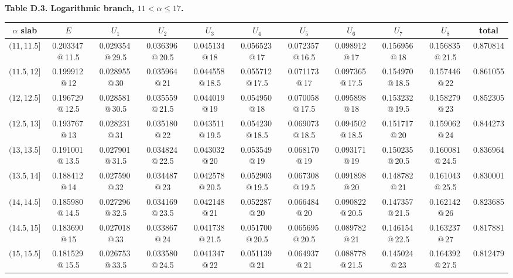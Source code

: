 \documentclass[11pt]{amsart}
\theoremstyle{definition}
\begin{document}
\begin{landscape}
\scriptsize
\setlength{\tabcolsep}{2.8pt}
\renewcommand{\arraystretch}{1.08}
\begin{center}
\textbf{Table D.3. Logarithmic branch, $11<\alpha\le17$.}\par\medskip
\begin{tabular}{c|c|cccccccc|c}
\toprule
$\alpha$ slab & $E$ & $U_1$ & $U_2$ & $U_3$ & $U_4$ & $U_5$ & $U_6$ & $U_7$ & $U_8$ & total\\
\midrule
$(11,11.5]$ & 0.203347\,@\,11.5 & 0.029354\,@\,29.5 & 0.036396\,@\,20.5 & 0.045134\,@\,18 & 0.056523\,@\,17 & 0.072357\,@\,16.5 & 0.098912\,@\,17 & 0.156956\,@\,18 & 0.156835\,@\,21.5 & 0.870814 \\
$(11.5,12]$ & 0.199912\,@\,12 & 0.028955\,@\,30 & 0.035964\,@\,21 & 0.044558\,@\,18.5 & 0.055712\,@\,17.5 & 0.071173\,@\,17 & 0.097365\,@\,17.5 & 0.154970\,@\,18.5 & 0.157446\,@\,22 & 0.861055 \\
$(12,12.5]$ & 0.196729\,@\,12.5 & 0.028581\,@\,30.5 & 0.035559\,@\,21.5 & 0.044019\,@\,19 & 0.054950\,@\,18 & 0.070058\,@\,17.5 & 0.095898\,@\,18 & 0.153232\,@\,19.5 & 0.158279\,@\,23 & 0.852305 \\
$(12.5,13]$ & 0.193767\,@\,13 & 0.028231\,@\,31 & 0.035180\,@\,22 & 0.043511\,@\,19.5 & 0.054230\,@\,18.5 & 0.069073\,@\,18.5 & 0.094502\,@\,18.5 & 0.151717\,@\,20 & 0.159062\,@\,24 & 0.844273 \\
$(13,13.5]$ & 0.191001\,@\,13.5 & 0.027901\,@\,31.5 & 0.034824\,@\,22.5 & 0.043032\,@\,20 & 0.053549\,@\,19 & 0.068170\,@\,19 & 0.093171\,@\,19 & 0.150235\,@\,20.5 & 0.160081\,@\,24.5 & 0.836964 \\
$(13.5,14]$ & 0.188412\,@\,14 & 0.027590\,@\,32 & 0.034487\,@\,23 & 0.042578\,@\,20.5 & 0.052903\,@\,19.5 & 0.067308\,@\,19.5 & 0.091898\,@\,20 & 0.148782\,@\,21 & 0.161043\,@\,25.5 & 0.830001 \\
$(14,14.5]$ & 0.185980\,@\,14.5 & 0.027296\,@\,32.5 & 0.034169\,@\,23.5 & 0.042148\,@\,21 & 0.052287\,@\,20 & 0.066484\,@\,20 & 0.090822\,@\,20.5 & 0.147357\,@\,21.5 & 0.162142\,@\,26 & 0.823685 \\
$(14.5,15]$ & 0.183690\,@\,15 & 0.027018\,@\,33 & 0.033867\,@\,24 & 0.041738\,@\,21.5 & 0.051700\,@\,20.5 & 0.065695\,@\,20.5 & 0.089782\,@\,21 & 0.146154\,@\,22.5 & 0.163237\,@\,27 & 0.817881 \\
$(15,15.5]$ & 0.181529\,@\,15.5 & 0.026753\,@\,33.5 & 0.033580\,@\,24.5 & 0.041347\,@\,22 & 0.051139\,@\,21 & 0.064937\,@\,21 & 0.088778\,@\,21.5 & 0.145024\,@\,23 & 0.164392\,@\,27.5 & 0.812479 \\

\end{tabular}
\end{center}
\end{landscape}
\end{document}
